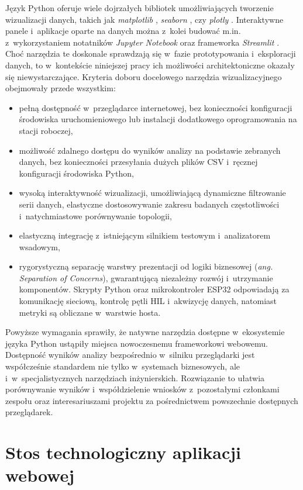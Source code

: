 Język Python oferuje wiele dojrzałych bibliotek umożliwiających tworzenie wizualizacji danych, takich jak \textit{matplotlib} \cite{matplotlib}, \textit{seaborn} \cite{seaborn}, czy \textit{plotly} \cite{plotly}.
Interaktywne panele i~aplikacje oparte na danych można z~kolei budować m.in. z~wykorzystaniem notatników \textit{Jupyter Notebook} \cite{jupyter} oraz frameworka \textit{Streamlit} \cite{streamlit}.
Choć narzędzia te doskonale sprawdzają się w~fazie prototypowania i~eksploracji danych, to w~kontekście niniejszej pracy ich możliwości architektoniczne okazały się niewystarczające.
Kryteria doboru docelowego narzędzia wizualizacyjnego obejmowały przede wszystkim:
\begin{itemize}
	\item pełną dostępność w~przeglądarce internetowej, bez konieczności konfiguracji środowiska uruchomieniowego lub instalacji dodatkowego oprogramowania na stacji roboczej,
	\item możliwość zdalnego dostępu do wyników analizy na podstawie zebranych danych, bez konieczności przesyłania dużych plików CSV i~ręcznej konfiguracji środowiska Python,
	\item wysoką interaktywność wizualizacji, umożliwiającą dynamiczne filtrowanie serii danych, elastyczne dostosowywanie zakresu badanych częstotliwości i~natychmiastowe porównywanie topologii,
	\item elastyczną integrację z~istniejącym silnikiem testowym i~analizatorem wsadowym,
	\item rygorystyczną separację warstwy prezentacji od logiki biznesowej (\textit{ang. Separation of Concerns}), gwarantującą niezależny rozwój i~utrzymanie komponentów.
	      Skrypty Python oraz mikrokontroler ESP32 odpowiadają za komunikację sieciową, kontrolę pętli HIL i~akwizycję danych, natomiast metryki są obliczane w~warstwie hosta.
\end{itemize}

Powyższe wymagania sprawiły, że natywne narzędzia dostępne w~ekosystemie języka Python ustąpiły miejsca nowoczesnemu frameworkowi webowemu.
Dostępność wyników analizy bezpośrednio w~silniku przeglądarki jest współcześnie standardem nie tylko w~systemach biznesowych, ale i~w~specjalistycznych narzędziach inżynierskich.
Rozwiązanie to ułatwia porównywanie wyników i~współdzielenie wniosków z~pozostałymi członkami zespołu oraz interesariuszami projektu za pośrednictwem powszechnie dostępnych przeglądarek.

\section{Stos technologiczny aplikacji webowej}
\label{sec:stos-technologiczny-aplikacji-webowej}

